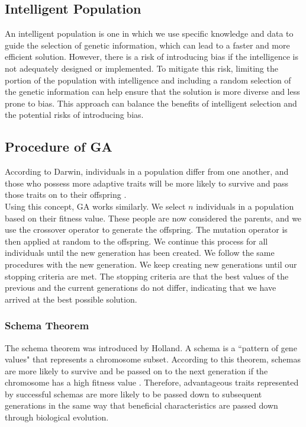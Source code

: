 \documentclass[12pt]{report}
\begin{document}
\subsection{Intelligent Population}
An intelligent population is one in which we use specific knowledge and data to guide the selection of genetic information, which can lead to a faster and more efficient solution. However, there is a risk of introducing bias if the intelligence is not adequately designed or implemented. To mitigate this risk, limiting the portion of the population with intelligence and including a random selection of the genetic information can help ensure that the solution is more diverse and less prone to bias. This approach can balance the benefits of intelligent selection and the potential risks of introducing bias.
\subsection{Procedure of GA}

According to Darwin, individuals in a population differ from one another, and those who possess more adaptive traits will be more likely to survive and pass those traits on to their offspring \cite{source4}. 
\\ \newline
\noindent 
Using this concept, GA works similarly. We select $n$ individuals in a population based on their fitness value.  These people are now considered the parents, and we use the crossover operator to generate the offspring. The mutation operator is then applied at random to the offspring.  We continue this process for all individuals until the new generation has been created. We follow the same procedures with the new generation. We keep creating new generations until our stopping criteria are met. The stopping criteria are that the best values of the previous and the current generations do not differ, indicating that we have arrived at the best possible solution.
\subsubsection*{Schema Theorem}
The schema theorem was introduced by Holland. A schema is a ``pattern of gene values" \cite{beasley1993overview} that represents a chromosome subset. According to this theorem, schemas are more likely to survive and be passed on to the next generation if the chromosome has a high fitness value \cite{beasley1993overview}. Therefore, advantageous traits represented by successful schemas are more likely to be passed down to subsequent generations in the same way that beneficial characteristics are passed down through biological evolution. 
\end{document}
